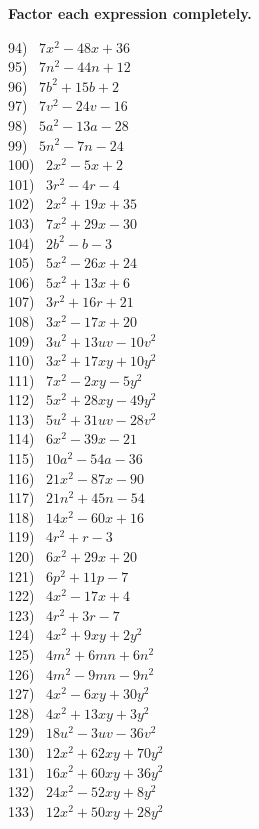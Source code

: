 \documentclass[12pt]{book}
\theoremstyle{definition}
\begin{document}
{\bf Factor each expression completely.}
\label{aisnot1}
\begin{multicols}{3}
  94)~ $7 x^2 - 48 x + 36$\\
  95)~ $7 n^2 - 44 n + 12$\\
  96)~ $7 b^2 + 15 b + 2$\\
  97)~ $7 v^2 - 24 v - 16$\\
  98)~ $5 a^2 - 13 a - 28$\\
  99)~ $5 n^2 - 7 n - 24$\\
  100)~ $2 x^2 - 5 x + 2$\\
  101)~ $3 r^2 - 4 r - 4$\\
  102)~ $2 x^2 + 19 x + 35$\\
  103)~ $7 x^2 + 29 x - 30$\\
  104)~ $2 b^2 - b - 3$\\
  105)~ $5 x^2 - 26 x + 24$\\
  106)~ $5 x^2 + 13 x + 6$\\
  107)~ $3 r^2 + 16 r + 21$\\
  108)~ $3 x^2 - 17 x + 20$\\
  109)~ $3 u^2 + 13 u v - 10 v^2$\\
  110)~ $3 x^2 + 17 x y + 10 y^2$\\
  111)~ $7 x^2 - 2 x y - 5 y^2$\\
  112)~ $5 x^2 + 28 x y - 49 y^2$\\
  113)~ $5 u^2 + 31 u v - 28 v^2$\\
  114)~ $6 x^2 - 39 x - 21$\\
  115)~ $10 a^2 - 54 a - 36$\\
  116)~ $21 x^2 - 87 x - 90$\\
  117)~ $21 n^2 + 45 n - 54$\\
  118)~ $14 x^2 - 60 x + 16$\\
  119)~ $4 r^2 + r - 3$\\
  120)~ $6 x^2 + 29 x + 20$\\
  121)~ $6 p^2 + 11 p - 7$\\
  122)~ $4 x^2 - 17 x + 4$\\
  123)~ $4 r^2 + 3 r - 7$\\
  124)~ $4 x^2 + 9 x y + 2 y^2$\\
  125)~ $4 m^2 + 6 m n + 6 n^2$\\
  126)~ $4 m^2 - 9 m n - 9 n^2$\\
  127)~ $4 x^2 - 6 x y + 30 y^2$\\
  128)~ $4 x^2 + 13 x y + 3 y^2$\\
  129)~ $18 u^2 - 3 u v - 36 v^2$\\
  130)~ $12 x^2 + 62 x y + 70 y^2$\\
  131)~ $16 x^2 + 60 x y + 36 y^2$\\
  132)~ $24 x^2 - 52 x y + 8 y^2$\\
  133)~ $12 x^2 + 50 x y + 28 y^2$
\end{multicols}
\end{document}
